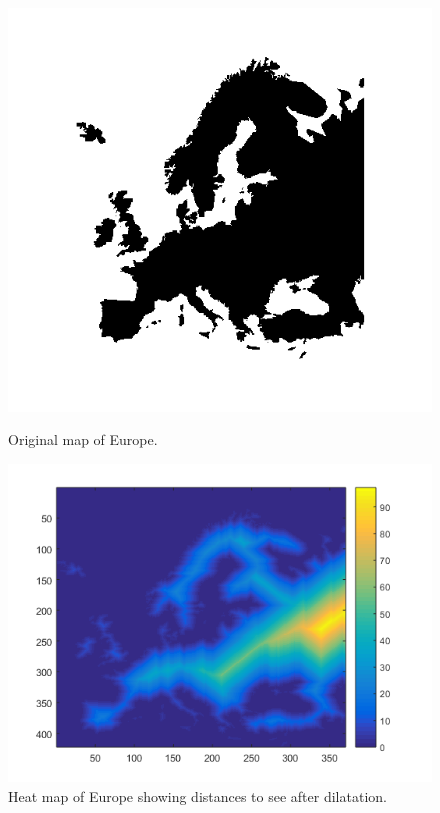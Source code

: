 \begin{figure}[H]
	\centering
	\begin{minipage}[t]{0.4\textwidth}
		\includegraphics[width=\textwidth]{images/eumap.png}
		\caption{Original map of Europe.}
		\label{fig:eumap}
	\end{minipage}
	\begin{minipage}[t]{0.4\textwidth}
		\includegraphics[width=\textwidth]{images/euheatmap.png}
		\caption{Heat map of Europe showing distances to see after dilatation.}
		\label{fig:euheatmap}
	\end{minipage}
\end{figure}

